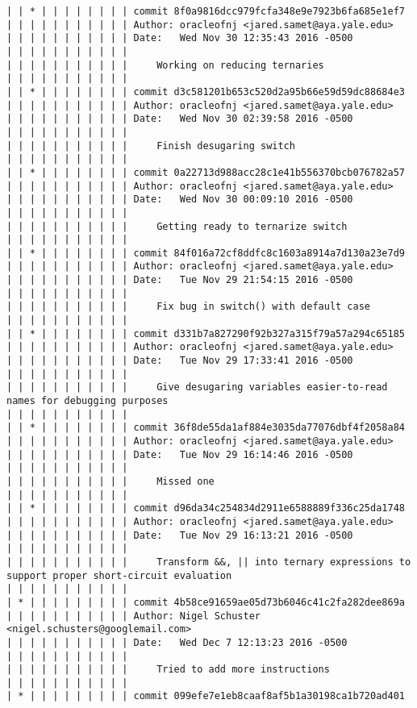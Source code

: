 \begin{lstlisting}
| | * | | | | | | | | commit 8f0a9816dcc979fcfa348e9e7923b6fa685e1ef7
| | | | | | | | | | | Author: oracleofnj <jared.samet@aya.yale.edu>
| | | | | | | | | | | Date:   Wed Nov 30 12:35:43 2016 -0500
| | | | | | | | | | | 
| | | | | | | | | | |     Working on reducing ternaries
| | | | | | | | | | |            
| | * | | | | | | | | commit d3c581201b653c520d2a95b66e59d59dc88684e3
| | | | | | | | | | | Author: oracleofnj <jared.samet@aya.yale.edu>
| | | | | | | | | | | Date:   Wed Nov 30 02:39:58 2016 -0500
| | | | | | | | | | | 
| | | | | | | | | | |     Finish desugaring switch
| | | | | | | | | | |            
| | * | | | | | | | | commit 0a22713d988acc28c1e41b556370bcb076782a57
| | | | | | | | | | | Author: oracleofnj <jared.samet@aya.yale.edu>
| | | | | | | | | | | Date:   Wed Nov 30 00:09:10 2016 -0500
| | | | | | | | | | | 
| | | | | | | | | | |     Getting ready to ternarize switch
| | | | | | | | | | |            
| | * | | | | | | | | commit 84f016a72cf8ddfc8c1603a8914a7d130a23e7d9
| | | | | | | | | | | Author: oracleofnj <jared.samet@aya.yale.edu>
| | | | | | | | | | | Date:   Tue Nov 29 21:54:15 2016 -0500
| | | | | | | | | | | 
| | | | | | | | | | |     Fix bug in switch() with default case
| | | | | | | | | | |            
| | * | | | | | | | | commit d331b7a827290f92b327a315f79a57a294c65185
| | | | | | | | | | | Author: oracleofnj <jared.samet@aya.yale.edu>
| | | | | | | | | | | Date:   Tue Nov 29 17:33:41 2016 -0500
| | | | | | | | | | | 
| | | | | | | | | | |     Give desugaring variables easier-to-read names for debugging purposes
| | | | | | | | | | |            
| | * | | | | | | | | commit 36f8de55da1af884e3035da77076dbf4f2058a84
| | | | | | | | | | | Author: oracleofnj <jared.samet@aya.yale.edu>
| | | | | | | | | | | Date:   Tue Nov 29 16:14:46 2016 -0500
| | | | | | | | | | | 
| | | | | | | | | | |     Missed one
| | | | | | | | | | |            
| | * | | | | | | | | commit d96da34c254834d2911e6588889f336c25da1748
| | | | | | | | | | | Author: oracleofnj <jared.samet@aya.yale.edu>
| | | | | | | | | | | Date:   Tue Nov 29 16:13:21 2016 -0500
| | | | | | | | | | | 
| | | | | | | | | | |     Transform &&, || into ternary expressions to support proper short-circuit evaluation
| | | | | | | | | | |            
| * | | | | | | | | | commit 4b58ce91659ae05d73b6046c41c2fa282dee869a
| | | | | | | | | | | Author: Nigel Schuster <nigel.schusters@googlemail.com>
| | | | | | | | | | | Date:   Wed Dec 7 12:13:23 2016 -0500
| | | | | | | | | | | 
| | | | | | | | | | |     Tried to add more instructions
| | | | | | | | | | |            
| * | | | | | | | | | commit 099efe7e1eb8caaf8af5b1a30198ca1b720ad401

\end{lstlisting}
